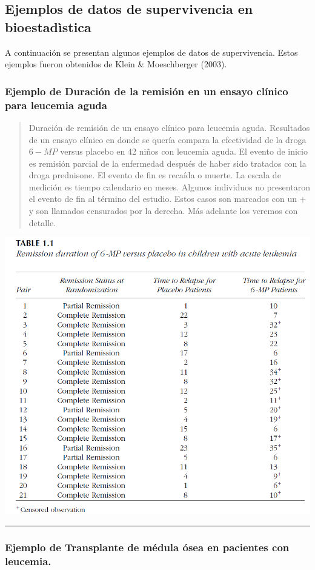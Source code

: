\documentclass[
  letterpaper,
  DIV=11,
  numbers=noendperiod]{scrartcl}
\begin{document}
\subsection{Ejemplos de datos de supervivencia en
bioestadìstica}\label{ejemplos-de-datos-de-supervivencia-en-bioestaduxecstica}

A continuación se presentan algunos ejemplos de datos de supervivencia.
Estos ejemplos fueron obtenidos de Klein \& Moeschberger (2003).

\subsubsection{Ejemplo de Duración de la remisión en un ensayo clínico
para leucemia
aguda}\label{ejemplo-de-duraciuxf3n-de-la-remisiuxf3n-en-un-ensayo-cluxednico-para-leucemia-aguda}

\begin{quote}
Duración de remisión de un ensayo clínico para leucemia aguda.
Resultados de un ensayo clínico en donde se quería compara la
efectividad de la droga \(6-MP\) versus placebo en 42 niños con leucemia
aguda. El evento de inicio es remisión parcial de la enfermedad después
de haber sido tratados con la droga prednisone. El evento de fin es
recaída o muerte. La escala de medición es tiempo calendario en meses.
Algunos individuos no presentaron el evento de fin al término del
estudio. Estos casos son marcados con un + y son llamados censurados por
la derecha. Más adelante los veremos con detalle.
\end{quote}

\begin{center}
\includegraphics[width=0.4\linewidth,height=\textheight,keepaspectratio]{figura/ejemp1.png}
\end{center}

\begin{center}\rule{0.5\linewidth}{0.5pt}\end{center}

\subsubsection{Ejemplo de Transplante de médula ósea en pacientes con
leucemia.}\label{ejemplo-de-transplante-de-muxe9dula-uxf3sea-en-pacientes-con-leucemia.}
\end{document}
